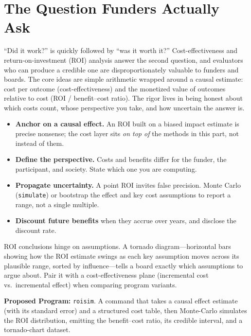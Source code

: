 \documentclass[
    a4paper,
    fontsize=10pt,
    twoside=true,
    numbers=noenddot,
]{kaobook}
\newenvironment{vizcallout}[1][Visualization to build]{%
    \begin{vizbox}[frametitle={#1}]%
}{%
    \end{vizbox}%
}
\begin{document}
\section{The Question Funders Actually Ask}
\enquote{Did it work?} is quickly followed by \enquote{was it worth it?} Cost-effectiveness and return-on-investment (ROI) analysis answer the second question, and evaluators who can produce a credible one are disproportionately valuable to funders and boards. The core ideas are simple arithmetic wrapped around a causal estimate: cost per outcome (cost-effectiveness) and the monetized value of outcomes relative to cost (ROI / benefit--cost ratio). The rigor lives in being honest about which costs count, whose perspective you take, and how uncertain the answer is.
\begin{itemize}
    \item \textbf{Anchor on a causal effect.} An ROI built on a biased impact estimate is precise nonsense; the cost layer sits \emph{on top of} the methods in this part, not instead of them.
    \item \textbf{Define the perspective.} Costs and benefits differ for the funder, the participant, and society. State which one you are computing.
    \item \textbf{Propagate uncertainty.} A point ROI invites false precision. Monte Carlo (\texttt{simulate}) or bootstrap the effect and key cost assumptions to report a range, not a single multiple.
    \item \textbf{Discount future benefits} when they accrue over years, and disclose the discount rate.
\end{itemize}

\begin{vizcallout}[Visualization to build: the tornado / sensitivity chart]
ROI conclusions hinge on assumptions. A tornado diagram---horizontal bars showing how the ROI estimate swings as each key assumption moves across its plausible range, sorted by influence---tells a board exactly which assumptions to argue about. Pair it with a cost-effectiveness plane (incremental cost vs.\ incremental effect) when comparing program variants.
\end{vizcallout}

\begin{kaobox}[frametitle=Ado-file Idea: \texttt{roisim}]
\textbf{Proposed Program:} \texttt{roisim}. A command that takes a causal effect estimate (with its standard error) and a structured cost table, then Monte-Carlo simulates the ROI distribution, emitting the benefit--cost ratio, its credible interval, and a tornado-chart dataset.
\end{kaobox}
\end{document}
